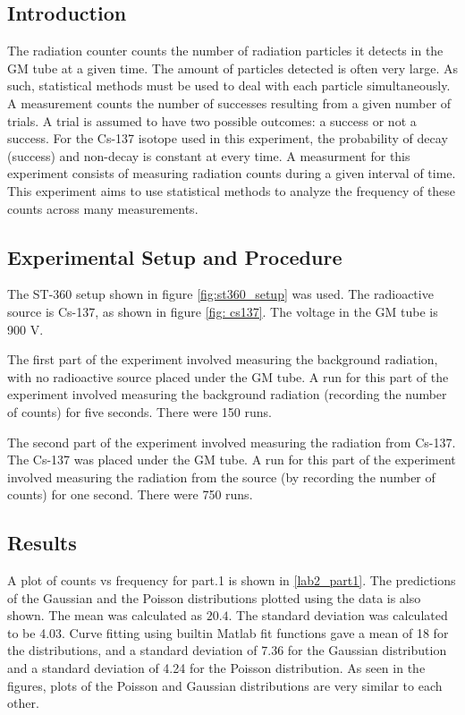 \documentclass[reprint,amsmath,amssymb,aps,prl]{revtex4-2}
\begin{document}
\subsection{Introduction}
The radiation counter counts the number of radiation particles it detects in the GM tube at a given time. The amount of particles detected is often very large. As such, statistical methods must be used to deal with each particle simultaneously. A measurement counts the number of successes resulting from a given number of trials. A trial is assumed to have two possible outcomes: a success or not a success. For the Cs-137 isotope used in this experiment, the probability of decay (success) and non-decay is constant at every time. A measurment for this experiment consists of measuring radiation counts during a given interval of time. This experiment aims to use statistical methods to analyze the frequency of these counts across many measurements. 

\subsection{Experimental Setup and Procedure}
The ST-360 setup shown in figure \ref{fig:st360_setup} was used. The radioactive source is Cs-137, as shown in figure \ref{fig: cs137}. 
The voltage in the GM tube is 900 V. 

The first part of the experiment involved measuring the background radiation, with no radioactive source placed under the GM tube. A run for this part of the experiment involved measuring the background radiation (recording the number of counts) for five seconds. There were 150 runs.

The second part of the experiment involved measuring the radiation from Cs-137. The Cs-137 was placed under the GM tube. A run for this part of the experiment  involved measuring the radiation from the source (by recording the number of counts) for one second. There were 750 runs. 

\subsection{Results}
A plot of counts vs frequency for part.1 is shown in \ref{lab2_part1}. The predictions of the Gaussian and the Poisson distributions plotted using the data is also shown. The mean was calculated as $20.4$. The standard deviation was calculated to be 4.03. Curve fitting using builtin Matlab fit functions gave a mean of 18 for the distributions, and a standard deviation of 7.36 for the Gaussian distribution and a standard deviation of 4.24 for the Poisson distribution. As seen in the figures, plots of the Poisson and Gaussian distributions are very similar to each other. 
\end{document}
